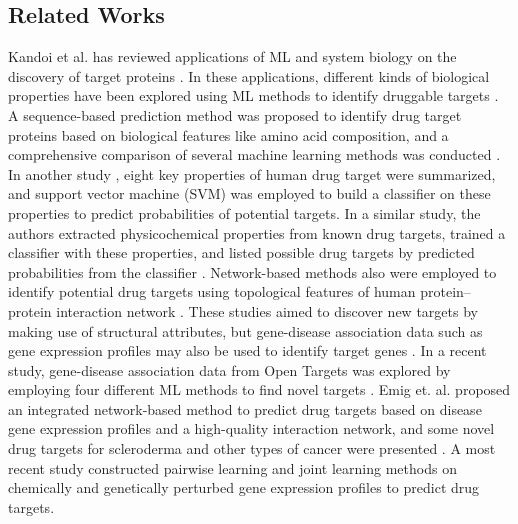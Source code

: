   \subsection{Related Works}
    Kandoi et al. has reviewed applications of ML and system biology on the discovery of target proteins \cite{kandoi2015prediction}. In these applications, different kinds of biological properties have been explored using ML methods to identify druggable targets \cite{bakheet2009properties, fauman2011structure, li2015large,kumari2015identification, li2007prediction}. A sequence-based prediction method was proposed to identify drug target proteins based on biological features like amino acid composition, and a comprehensive comparison of several machine learning methods was conducted \cite{kumari2015identification}. In another study \cite{bakheet2009properties}, eight key properties of human drug target were summarized, and support vector machine (SVM) was employed to build a classifier on these properties to predict probabilities of potential targets. In a similar study, the authors extracted physicochemical properties from known drug targets, trained a classifier with these properties, and listed possible drug targets by predicted probabilities from the classifier \cite{li2007prediction}. Network-based methods also were employed to identify potential drug targets using topological features of human protein–protein interaction network \cite{li2015large}. These studies aimed to discover new targets by making use of structural attributes, but gene-disease association data such as gene expression profiles may also be used to identify target genes \cite{emig2013drug, ferrero2017silico, sawada2018predicting, costa2010machine}. In a recent study, gene-disease association data from Open Targets was explored by employing four different ML methods to find novel targets \cite{ferrero2017silico}. Emig et. al. proposed an integrated network-based method to predict drug targets based on disease gene expression profiles and a high-quality interaction network, and some novel drug targets for scleroderma and other types of cancer were presented \cite{emig2013drug}. A most recent study constructed pairwise learning and joint learning methods on chemically and genetically perturbed gene expression profiles to predict drug targets\cite{sawada2018predicting}. 

